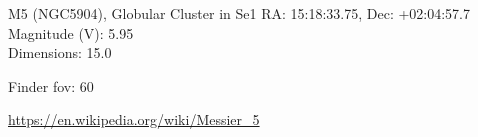 \begin{block}{M5 (NGC5904), Globular Cluster in Se1}
    RA: 15:18:33.75, Dec: +02:04:57.7 \\ 
    Magnitude (V): 5.95 \\ 
    Dimensions: 15.0 

    Finder fov: 60 

    \url{https://en.wikipedia.org/wiki/Messier_5} 
\end{block}